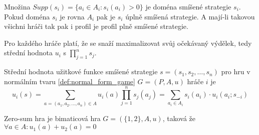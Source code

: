 \begin{definition}
\label{def:support_strategy}
Množina $Supp(s_i) = \{a_i \in A_i : s_i(a_i) > 0\}$ je doména smíšené strategie $s_i$. Pokud doména $s_i$ je rovna $A_i$ pak je $s_i$ úplně smíšená strategie. A mají-li takovou všichni hráči tak pak i profil je profil plně smíšené strategie. 
\end{definition}
Pro každého hráče platí, že se snaží maximalizovat svůj očekávaný výdělek, tedy střední hodnota $u_i$ s $\prod^n_{j=1} s_j$. 
\begin{definition}
\label{def:expected_payoff}
Střední hodnota užitkové funkce smíšené strategie $s = (s_1, s_2, \dots, s_n)$ pro hru v normálním tvaru \ref{def:normal_form_game} $G= (P, A, u)$ hráče $i$ je 
\[
    u_i(s) = \sum_{a = (a_1, a_2, \dots, a_n) \in A} u_i(a) \prod_{j=1}^n s_j(a_j) = \sum_{a_i\in A_i} s_i(a_i) \cdot u_i(a_i; s_{-i})
\]
\end{definition}

\begin{definition}
\label{def:zero_sum}
Zero-sum hra je bimaticová hra $G = (\{1,2\}, A, u)$, taková že $\forall a \in A: u_1(a) + u_2(a) = 0$
\end{definition}

